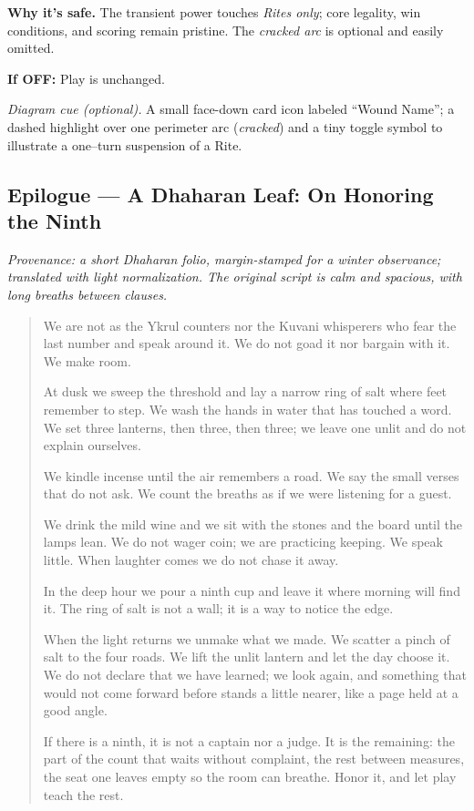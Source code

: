 \documentclass[11pt]{article}
\begin{document}
\medskip
\noindent\textbf{Why it’s safe.} The transient power touches \emph{Rites only}; core legality, win conditions, and scoring remain pristine. The \emph{cracked arc} is optional and easily omitted.

\medskip
\noindent\textbf{If \textsc{OFF}:} Play is unchanged.

\medskip
\noindent\textit{Diagram cue (optional).} A small face-down card icon labeled “Wound Name”; a dashed highlight over one perimeter arc (\emph{cracked}) and a tiny toggle symbol to illustrate a one–turn suspension of a Rite.

\subsection*{Epilogue — A Dhaharan Leaf: On Honoring the Ninth}
\label{epilogue:dhahara-ninth}
{}

\noindent\textit{Provenance: a short Dhaharan folio, margin-stamped for a winter observance; translated with light normalization. The original script is calm and spacious, with long breaths between clauses.}

\medskip
\begin{quote}\small
We are not as the Ykrul counters nor the Kuvani whisperers who fear the last number and speak around it. We do not goad it nor bargain with it. We make room.

At dusk we sweep the threshold and lay a narrow ring of salt where feet remember to step. We wash the hands in water that has touched a word. We set three lanterns, then three, then three; we leave one unlit and do not explain ourselves.

We kindle incense until the air remembers a road. We say the small verses that do not ask. We count the breaths as if we were listening for a guest.

We drink the mild wine and we sit with the stones and the board until the lamps lean. We do not wager coin; we are practicing keeping. We speak little. When laughter comes we do not chase it away.

In the deep hour we pour a ninth cup and leave it where morning will find it. The ring of salt is not a wall; it is a way to notice the edge.

When the light returns we unmake what we made. We scatter a pinch of salt to the four roads. We lift the unlit lantern and let the day choose it. We do not declare that we have learned; we look again, and something that would not come forward before stands a little nearer, like a page held at a good angle.

If there is a ninth, it is not a captain nor a judge. It is the remaining: the part of the count that waits without complaint, the rest between measures, the seat one leaves empty so the room can breathe. Honor it, and let play teach the rest.
\end{quote}
\end{document}
